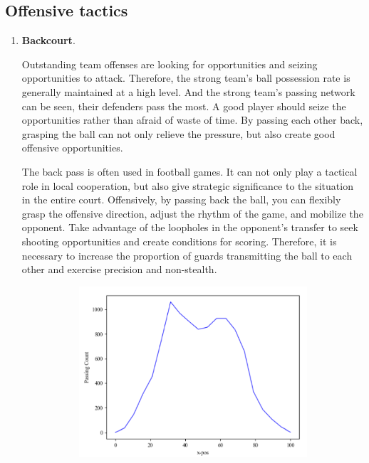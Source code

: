 \documentclass{mcmthesis}
\begin{document}
\subsection{Offensive tactics}
\begin{enumerate}[(1)]
	\item \textbf{Backcourt}.\par
	\qquad Outstanding team offenses are looking for opportunities and seizing opportunities to attack. Therefore, the strong team's ball possession rate is generally maintained at a high level. And the strong team's passing network can be seen, their defenders pass the most. A good player should seize the opportunities rather than afraid of waste of time. By passing each other back, grasping the ball can not only relieve the pressure, but also create good offensive opportunities. \par
	\qquad The back pass is often used in football games. It can not only play a tactical role in local cooperation, but also give strategic significance to the situation in the entire court. Offensively, by passing back the ball, you can flexibly grasp the offensive direction, adjust the rhythm of the game, and mobilize the opponent. Take advantage of the loopholes in the opponent's transfer to seek shooting opportunities and create conditions for scoring. Therefore, it is necessary to increase the proportion of guards transmitting the ball to each other and exercise precision and non-stealth.
	\begin{figure}[h]
		\centering
		\begin{subfigure}[b]{0.45\textwidth}
			\includegraphics[width=\textwidth]{figures/backcourt.png}

\end{subfigure}
\end{figure}
\end{enumerate}
\end{document}
